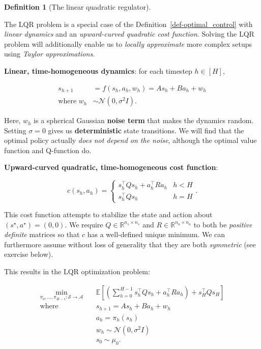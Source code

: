 \documentclass[
  letterpaper,
  DIV=11,
  numbers=noendperiod]{scrreprt}
\theoremstyle{plain}
\theoremstyle{plain}
\theoremstyle{definition}
\theoremstyle{definition}
\newtheorem{definition}{Definition}[chapter]
\theoremstyle{remark}
\begin{document}
\begin{definition}[The linear quadratic
regulator]\protect\hypertarget{def-lqr_definition}{}\label{def-lqr_definition}

The LQR problem is a special case of the
Definition~\ref{def-optimal_control} with \emph{linear dynamics} and an
\emph{upward-curved quadratic cost function}. Solving the LQR problem
will additionally enable us to \emph{locally approximate} more complex
setups using \emph{Taylor approximations}.

\textbf{Linear, time-homogeneous dynamics}: for each timestep
\(h\in [H]\),

\[
\begin{aligned}
    s_{h+1} &= f(s_h, a_h, w_h) = A s_h+ B a_h+ w_h\\
    \text{where } w_h&\sim \mathcal{N}(0, \sigma^2 I).
\end{aligned}
\]

Here, \(w_h\) is a spherical Gaussian \textbf{noise term} that makes the
dynamics random. Setting \(\sigma = 0\) gives us \textbf{deterministic}
state transitions. We will find that the optimal policy actually
\emph{does not depend on the noise}, although the optimal value function
and Q-function do.

\textbf{Upward-curved quadratic, time-homogeneous cost function}:

\[
c(s_h, a_h) = \begin{cases}
    s_h^\top Q s_h+ a_h^\top R a_h& h< H\\
    s_h^\top Q s_h& h= H
\end{cases}.
\]

This cost function attempts to stabilize the state and action about
\((s^\star, a^\star) = (0, 0)\). We require
\(Q \in \mathbb{R}^{n_s\times n_s}\) and
\(R \in \mathbb{R}^{n_a\times n_a}\) to both be \emph{positive definite}
matrices so that \(c\) has a well-defined unique minimum. We can
furthermore assume without loss of generality that they are both
\emph{symmetric} (see exercise below).

This results in the LQR optimization problem:

\[
\begin{aligned}
        \min_{\pi_0, \dots, \pi_{H-1} : \mathcal{S} \to \mathcal{A}} \quad & \mathbb{E}\left[ \left( \sum_{h=0}^{H-1} s_h^\top Q s_h+ a_h^\top R a_h\right) + s_H^\top Q s_H\right] \\
        \textrm{where} \quad                                & s_{h+1} = A s_h+ B a_h+ w_h\\
                                                            & a_h= \pi_h(s_h)                                                                                                        \\
                                                            & w_h\sim \mathcal{N}(0, \sigma^2 I)                                                                                               \\
                                                            & s_0 \sim \mu_0.
\end{aligned}
\]

\end{definition}
\end{document}
